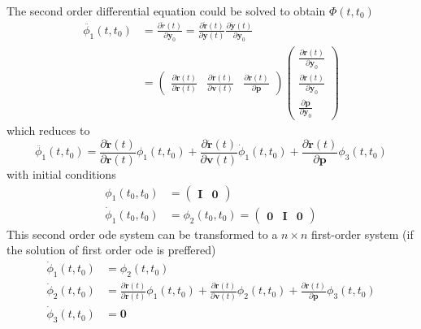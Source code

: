 The second order differential equation could be solved to obtain $\Phi (t, t_0)$
\begin{equation}\label{eq:tapleyg24}
  \begin{aligned}
    \ddot{\phi _1} (t,t_0) &= \frac{\partial \ddot{r}(t)}{\partial \bm{y}_0} = 
    \frac{\partial \ddot{\bm{r}}(t)}{\partial \bm{y}(t)}
      \frac{\partial \bm{\ddot{y}}(t)}{\partial \bm{y}_0} \\
    &=\begin{pmatrix}
      \frac{\partial \ddot{\bm{r}}(t)}{\partial \bm{r}(t)} & 
      \frac{\partial \ddot{\bm{r}}(t)}{\partial \bm{v}(t)} & 
      \frac{\partial \ddot{\bm{r}}(t)}{\partial \bm{p}} \end{pmatrix} 
    \begin{pmatrix}
      \frac{\partial       \bm{r} (t)}{\partial \bm{y}_0} \\
      \frac{\partial  \dot{\bm{r}}(t)}{\partial \bm{y}_0} \\
      \frac{\partial       \bm{p}    }{\partial \bm{y}_0} \end{pmatrix} 
  \end{aligned}
\end{equation}
which reduces to
\begin{equation}\label{eq:tapleyg25}
  \ddot{\phi _1} (t,t_0) = 
    \frac{\partial \ddot{\bm{r}}(t)}{\partial \bm{r}(t)} \phi _1 (t,t_0) 
    + \frac{\partial \ddot{\bm{r}}(t)}{\partial \bm{v}(t)} \dot{\phi} _1 (t,t_0) 
    + \frac{\partial \ddot{\bm{r}}(t)}{\partial \bm{p}} \phi _3 (t,t_0)
\end{equation}
with initial conditions
\begin{align}
  \phi _1 (t_0, t_0) &= \begin{pmatrix} \bm{I} & \bm{0} \end{pmatrix} \\
  \dot{\phi} _1 (t_0, t_0) &=  \phi _2 (t_0, t_0) = 
    \begin{pmatrix} \bm{0} & \bm{I} & \bm{0} \end{pmatrix}
\end{align}
This second order \gls{ode} system can be transformed to a $n \times n$ first-order system 
(if the solution of first order \gls{ode} is preffered)
\begin{equation}
  \begin{aligned}
    \dot{\phi} _1 (t,t_0) &= \phi _2 (t,t_0)\\
    \dot{\phi} _2 (t,t_0) &= \frac{\partial \ddot{\bm{r}}(t)}{\partial \bm{r}(t)} \phi _1 (t,t_0) 
      + \frac{\partial \ddot{\bm{r}}(t)}{\partial \bm{v}(t)} \phi _2 (t,t_0) 
      + \frac{\partial \ddot{\bm{r}}(t)}{\partial \bm{p}} \phi _3 (t,t_0) \\
    \dot{\phi} _3 (t,t_0) &= \bm{0}
  \end{aligned}
\end{equation}
